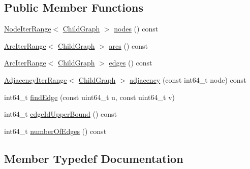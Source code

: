 \subsection*{Public Member Functions}
\begin{DoxyCompactItemize}
\item 
\hyperlink{structnifty_1_1graph_1_1DirectedGraphBase_1_1NodeIterRange}{Node\+Iter\+Range}$<$ \hyperlink{classnifty_1_1graph_1_1DirectedGraphBase_a583e01641aec296b9bc33a346f90a216}{Child\+Graph} $>$ \hyperlink{classnifty_1_1graph_1_1DirectedGraphBase_a6fcfc4a5a92e022bea68c52127913e5d}{nodes} () const
\item 
\hyperlink{structnifty_1_1graph_1_1DirectedGraphBase_1_1ArcIterRange}{Arc\+Iter\+Range}$<$ \hyperlink{classnifty_1_1graph_1_1DirectedGraphBase_a583e01641aec296b9bc33a346f90a216}{Child\+Graph} $>$ \hyperlink{classnifty_1_1graph_1_1DirectedGraphBase_a6548652bb60a375df4831fc859106018}{arcs} () const
\item 
\hyperlink{structnifty_1_1graph_1_1DirectedGraphBase_1_1ArcIterRange}{Arc\+Iter\+Range}$<$ \hyperlink{classnifty_1_1graph_1_1DirectedGraphBase_a583e01641aec296b9bc33a346f90a216}{Child\+Graph} $>$ \hyperlink{classnifty_1_1graph_1_1DirectedGraphBase_ac98d32be1691c74f0547e27bc6003446}{edges} () const
\item 
\hyperlink{structnifty_1_1graph_1_1DirectedGraphBase_1_1AdjacencyIterRange}{Adjacency\+Iter\+Range}$<$ \hyperlink{classnifty_1_1graph_1_1DirectedGraphBase_a583e01641aec296b9bc33a346f90a216}{Child\+Graph} $>$ \hyperlink{classnifty_1_1graph_1_1DirectedGraphBase_a5f46662c3792297461ab24fea8edd44f}{adjacency} (const int64\+\_\+t node) const
\item 
int64\+\_\+t \hyperlink{classnifty_1_1graph_1_1DirectedGraphBase_a49976a6e82bc84a7a2827e0e8592fc1a}{find\+Edge} (const uint64\+\_\+t u, const uint64\+\_\+t v)
\item 
int64\+\_\+t \hyperlink{classnifty_1_1graph_1_1DirectedGraphBase_a34202ef37f7c8fe10469ea4487e96243}{edge\+Id\+Upper\+Bound} () const
\item 
int64\+\_\+t \hyperlink{classnifty_1_1graph_1_1DirectedGraphBase_a6dde14aadeb86c8fba6f827bde9fbff5}{number\+Of\+Edges} () const
\end{DoxyCompactItemize}


\subsection{Member Typedef Documentation}
\mbox{\label{classnifty_1_1graph_1_1DirectedGraphBase_a583e01641aec296b9bc33a346f90a216}} 

